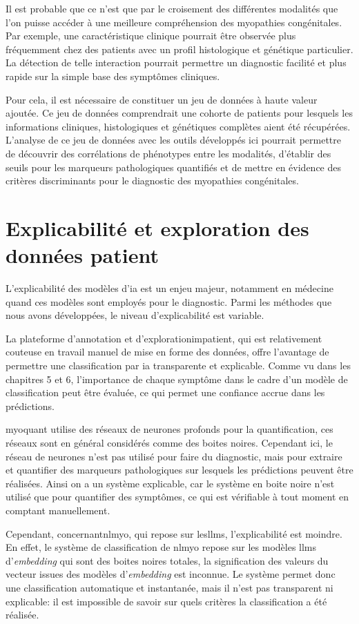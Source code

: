 Il est probable que ce n'est que par le croisement des différentes modalités que l'on puisse accéder à une meilleure compréhension des myopathies congénitales. Par exemple, une caractéristique clinique pourrait être observée plus fréquemment chez des patients avec un profil histologique et génétique particulier. La détection de telle interaction pourrait permettre un diagnostic facilité et plus rapide sur la simple base des symptômes cliniques.

Pour cela, il est nécessaire de constituer un jeu de données à haute valeur ajoutée. Ce jeu de données comprendrait une cohorte de patients pour lesquels les informations cliniques, histologiques et génétiques complètes aient été récupérées. L'analyse de ce jeu de données avec les outils développés ici pourrait permettre de découvrir des corrélations de phénotypes entre les modalités, d'établir des seuils pour les marqueurs pathologiques quantifiés et de mettre en évidence des critères discriminants pour le diagnostic des myopathies congénitales.

\section{Explicabilité et exploration des données patient}
L'explicabilité des modèles d'\gls{ia} est un enjeu majeur, notamment en médecine quand ces modèles sont employés pour le diagnostic. Parmi les méthodes que nous avons développées, le niveau d'explicabilité est variable.

La plateforme d'annotation et d'exploration\gls{impatient}, qui est relativement couteuse en travail manuel de mise en forme des données, offre l'avantage de permettre une classification par \gls{ia} transparente et explicable. Comme vu dans les chapitres 5 et 6, l'importance de chaque symptôme dans le cadre d'un modèle de classification peut être évaluée, ce qui permet une confiance accrue dans les prédictions.

\gls{myoquant} utilise des réseaux de neurones profonds pour la quantification, ces réseaux sont en général considérés comme des boites noires. Cependant ici, le réseau de neurones n'est pas utilisé pour faire du diagnostic, mais pour extraire et quantifier des marqueurs pathologiques sur lesquels les prédictions peuvent être réalisées. Ainsi on a un système explicable, car le système en boite noire n'est utilisé que pour quantifier des symptômes, ce qui est vérifiable à tout moment en comptant manuellement.

Cependant, concernant\gls{nlmyo}, qui repose sur les\gls{llms}, l'explicabilité est moindre. En effet, le système de classification de \gls{nlmyo} repose sur les modèles \gls{llms} d'\textit{embedding} qui sont des boites noires totales, la signification des valeurs du vecteur issues des modèles d'\textit{embedding} est inconnue. Le système permet donc une classification automatique et instantanée, mais il n'est pas transparent ni explicable: il est impossible de savoir sur quels critères la classification a été réalisée.

